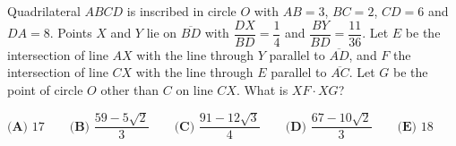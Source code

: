 Quadrilateral $ABCD$ is inscribed in circle $O$ with $AB=3$, $BC=2$, $CD=6$ and $DA=8$. Points $X$ and $Y$ lie on $\overline{BD}$ with $\dfrac{DX}{BD}=\dfrac14$ and $\dfrac{BY}{BD}=\dfrac{11}{36}$. Let $E$ be the intersection of line $AX$ with the line through $Y$ parallel to $\overline{AD}$, and $F$ the intersection of line $CX$ with the line through $E$ parallel to $\overline{AC}$. Let $G$ be the point of circle $O$ other than $C$ on line $CX$. What is $XF\cdot XG$?

$\textbf{(A) }17\qquad\textbf{(B) }\dfrac{59-5\sqrt2}{3}\qquad\textbf{(C) }\dfrac{91-12\sqrt3}{4}\qquad\textbf{(D) }\dfrac{67-10\sqrt2}{3}\qquad\textbf{(E) }18$
